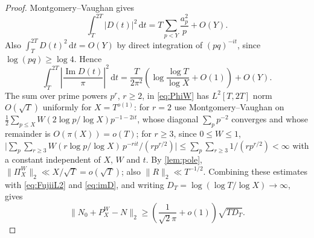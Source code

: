 \documentclass[11pt,a4paper]{article}
\numberwithin{equation}{section}
\theoremstyle{definition}
\theoremstyle{remark}
\newcommand{\dd}{\,\mathrm dt}
\begin{document}
\begin{proof}
Montgomery--Vaughan \cite{MontgomeryVaughan} gives
\begin{equation}
\int_T^{2T}|D(t)|^2\dd
=T\sum_{p<Y}\frac{a_p^2}{p}+O(Y).
\end{equation}
Also $\int_T^{2T}D(t)^2\dd=O(Y)$ by direct integration of $(pq)^{-it}$, since $\log(pq)\ge\log4$. Hence
\begin{equation}\label{eq:imD}
\int_T^{2T}\left|\frac{\operatorname{Im}D(t)}\pi\right|^2\dd
=\frac{T}{2\pi^2}\left(\log\frac{\log T}{\log X}+O(1)\right)+O(Y).
\end{equation}
The sum over prime powers $p^r$, $r\ge2$, in \eqref{eq:PhiW} has $L^2[T,2T]$ norm $O(\sqrt T)$ uniformly for $X=T^{o(1)}$: for $r=2$ use Montgomery--Vaughan on
$\tfrac12\sum_{p\le X}W(2\log p/\log X)p^{-1-2it}$, whose diagonal $\sum_p p^{-2}$ converges and whose remainder is $O(\pi(X))=o(T)$; for $r\ge3$, since $0\le W\le1$, $\bigl|\sum_p\sum_{r\ge3}W(r\log p/\log X)\,p^{-rit}/(rp^{r/2})\bigr|\le\sum_p\sum_{r\ge3}1/(rp^{r/2})<\infty$ with a constant independent of $X$, $W$ and $t$. By \cref{lem:pole}, $\|\Pi_X^W\|_2\ll X/\sqrt T=o(\sqrt T)$; also $\|R\|_2\ll T^{-1/2}$. Combining these estimates with \eqref{eq:FujiiL2} and \eqref{eq:imD}, and writing $D_T=\log(\log T/\log X)\to\infty$, gives
\begin{equation}\label{eq:preclipL2}
\|N_0+P_X^W-N\|_2
\ge \left(\frac1{\sqrt2\pi}+o(1)\right)\sqrt{TD_T}.
\end{equation}


\end{proof}
\end{document}
